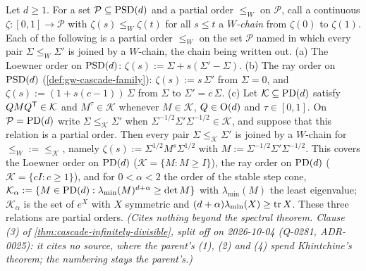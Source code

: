 \begin{lemma}
\label{lem:path-condition-orders}
\leanok
Let $d \ge 1$. For a set $\mathcal P \subseteq \mathrm{PSD}(d)$ and a partial order $\le_W$ on $\mathcal P$,
call a continuous $\zeta : [0,1] \to \mathcal P$ with $\zeta(s) \le_W \zeta(t)$ for all
$s \le t$ a \emph{$W$-chain} from $\zeta(0)$ to $\zeta(1)$. Each of the following is a partial
order $\le_W$ on the set $\mathcal P$ named in which every pair $\Sigma \le_W \Sigma'$ is joined by a
$W$-chain, the chain being written out.
(a) The Loewner order on $\mathrm{PSD}(d)$: $\zeta(s) := \Sigma + s(\Sigma' - \Sigma)$.
(b) The ray order on $\mathrm{PSD}(d)$ (\ref{def:gw-cascade-family}): $\zeta(s) := s\,\Sigma'$ from
$\Sigma = 0$, and $\zeta(s) := (1 + s(c - 1))\,\Sigma$ from $\Sigma$ to $\Sigma' = c\,\Sigma$.
(c) Let $\mathcal K \subseteq \mathrm{PD}(d)$ satisfy $QMQ^{\mathsf{T}} \in \mathcal K$ and $M^\tau \in \mathcal K$
whenever $M \in \mathcal K$, $Q \in \mathrm{O}(d)$ and $\tau \in [0,1]$. On $\mathcal P = \mathrm{PD}(d)$ write
$\Sigma \le_{\mathcal K} \Sigma'$ when $\Sigma^{-1/2}\Sigma'\Sigma^{-1/2} \in \mathcal K$, and suppose
that this relation is a partial order. Then every pair $\Sigma \le_{\mathcal K} \Sigma'$ is joined
by a $W$-chain for $\le_W := \le_{\mathcal K}$, namely
$\zeta(s) := \Sigma^{1/2}M^s\Sigma^{1/2}$ with $M := \Sigma^{-1/2}\Sigma'\Sigma^{-1/2}$.
This covers the Loewner order on $\mathrm{PD}(d)$ ($\mathcal K = \{M : M \ge I\}$), the ray order on $\mathrm{PD}(d)$
($\mathcal K = \{cI : c \ge 1\}$), and for $0 < \alpha < 2$ the order of the stable step cone,
$\mathcal K_\alpha := \{M \in \mathrm{PD}(d) : \lambda_{\min}(M)^{d+\alpha} \ge \det M\}$ with $\lambda_{\min}(M)$ the
least eigenvalue; $\mathcal K_\alpha$ is the set of $e^X$ with $X$ symmetric and
$(d+\alpha)\lambda_{\min}(X) \ge \operatorname{tr} X$. These three relations are partial orders.
\statusT\quad\emph{(Cites nothing beyond the spectral theorem. Clause (3) of
\ref{thm:cascade-infinitely-divisible}, split off on 2026-10-04 (Q-0281, ADR-0025): it cites no
source, where the parent's (1), (2) and (4) spend Khintchine's theorem; the numbering stays the
parent's.)}
\end{lemma}

